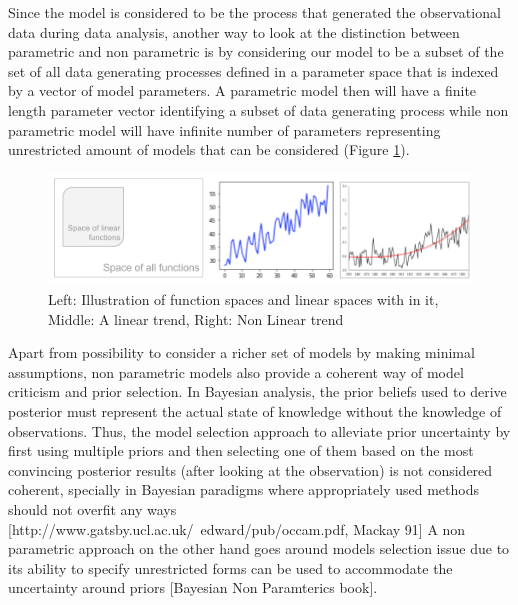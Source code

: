 Since the model is considered to be the process that generated the observational data during data analysis, another way to look at the distinction between parametric and non parametric is by considering our model to be a subset of the set of all data generating processes defined in a parameter space that is indexed by a vector of model parameters. A parametric model then will have a finite length parameter vector identifying a subset of data generating process while non parametric model will have infinite number of parameters representing unrestricted amount of models that can be considered (Figure \ref{fig:generic_function_space}). 
\begin{figure}
    \centering
    \includegraphics[scale=0.75]{thesis/images/function_spaces.png}
    \caption{Left: Illustration of function spaces and linear spaces with in it, Middle: A linear trend, Right: Non Linear trend}
    \label{fig:generic_function_space}
\end{figure}
Apart from possibility to consider a richer set of models by making minimal assumptions, non parametric models also provide a coherent way of model criticism and prior selection. In Bayesian analysis, the prior beliefs used to derive posterior must represent the actual state of knowledge without the knowledge of observations. Thus, the model selection approach to alleviate prior uncertainty by first using multiple priors and then selecting one of them based on the most convincing posterior results (after looking at the observation) is not considered coherent, specially in Bayesian paradigms where appropriately used methods should not overfit any ways [http://www.gatsby.ucl.ac.uk/~edward/pub/occam.pdf, Mackay 91] A non parametric approach on the other hand goes around models selection issue due to its ability to specify unrestricted forms can be used to accommodate the uncertainty around priors [Bayesian Non Paramterics book].

